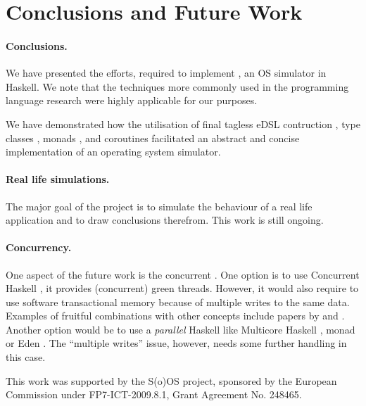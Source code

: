 \section{Conclusions and Future Work}
\label{sec:concl-future-work}

\paragraph{Conclusions.} 
We have presented the efforts, required to implement \soosim, an OS simulator in Haskell.
We note that the techniques more commonly used in the programming language research were highly applicable for our purposes.

We have demonstrated how the utilisation of final tagless eDSL contruction \cite{final_tagless_embedding}, type classes \cite{Hall:1996:TCH:227699.227700}, monads \cite{haskell-report} , and coroutines \cite{coroutines} facilitated an abstract and concise implementation of an operating system simulator.

\paragraph{Real life simulations.}
The major goal of the project is to simulate the behaviour of a real life application and to draw conclusions therefrom.
This work is still ongoing.

\paragraph{Concurrency.}
One aspect of the future work is the concurrent \soosim.
One option is to use Concurrent Haskell \cite{ConcHs}, it provides (concurrent) green threads.
However, it would also require to use software transactional memory \cite{springerlink:10.1007/s004460050028} because of multiple writes to the same data.
Examples of fruitful combinations with other concepts include papers by \citeauthor{Harris:2008:CMT:1378704.1378725} \cite{Harris:2008:CMT:1378704.1378725} and \citeauthor{Bieniusa:2010:BAA:1835698.1835714} \cite{Bieniusa:2010:BAA:1835698.1835714,springerlink:10.1007/978-3-642-25959-3_2}.
Another option would be to use a \emph{parallel} Haskell like Multicore Haskell \cite{marlow:rsm},  monad \cite{par-monad} or Eden \cite{eden}.
The ``multiple writes'' issue, however, needs some further handling in this case.

%

\acks

This work was supported by the S(o)OS project, sponsored by the European Commission under FP7-ICT-2009.8.1, Grant Agreement No. 248465.

